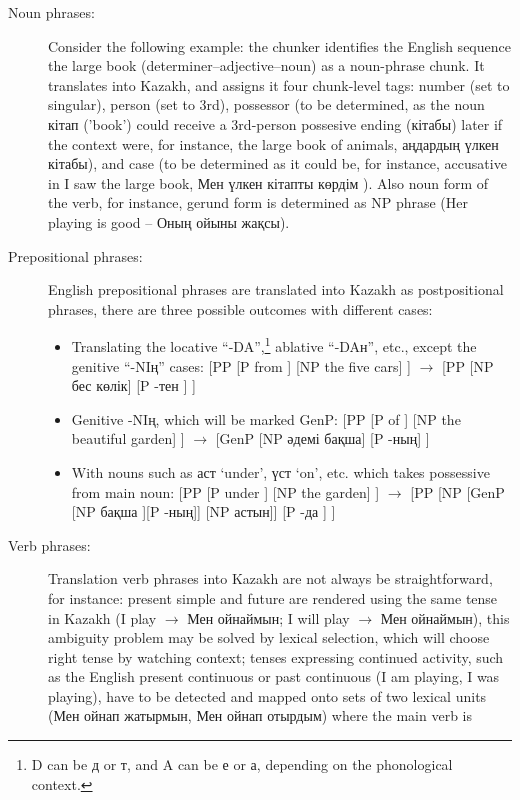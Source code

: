 \documentclass[11pt]{article}
\begin{document}
\begin{description}
\item[Noun phrases:] Consider the following example: the chunker identifies the English sequence 
  the large book  (determiner–adjective–noun) as a noun-phrase chunk. It translates into 
  Kazakh, and assigns it four chunk-level tags: number (set to singular), person (set to 3rd), 
  possessor (to be determined, as the noun кітап ('book') could receive a 3rd-person possesive 
  ending (кітабы) later if the context were, for instance, the large book of animals, аңдардың үлкен кітабы), 
  and case (to be determined as it could be, for instance, accusative in I saw the large book, Мен үлкен кітапты көрдім ). Also 
  noun form of the verb, for instance,  gerund form is determined as NP phrase (Her playing is good – Оның ойыны жақсы).
\item[Prepositional phrases:] English prepositional phrases are translated into Kazakh as postpositional phrases, 
  there are three possible outcomes with different cases:
   \begin{itemize}
    \item Translating the locative ``-{D}{A}'',\footnote{{D} can be д or т, and {A} can be е or а, depending on the 
        phonological context.} ablative ``-{D}{A}н'', etc., except the genitive ``-{N}{I}ң'' cases: 
        [PP [P from ] [NP the five cars] ] $\rightarrow$ [PP [NP бес көлік] [P -тен ] ]
    \item Genitive -{N}{I}ң, which will be marked GenP:  
        [PP [P of ] [NP the beautiful garden] ] $\rightarrow$ [GenP [NP әдемі бақша] [P -ның] ] 
    \item With nouns such as аст `under', үст `on', etc. which takes possessive from main noun:  
        [PP [P under ] [NP the garden] ] $\rightarrow$ [PP [NP [GenP [NP бақша ][P -ның]] [NP астын]] [P -да ] ]
    \end{itemize}
\item[Verb phrases:] Translation verb phrases into Kazakh  are not always be straightforward, for instance: 
  present simple and future are rendered using the same tense in Kazakh (I play $\rightarrow$ Мен ойнаймын;  I 
  will play $\rightarrow$ Мен ойнаймын), this ambiguity problem may be solved by lexical selection, 
  which will choose right tense by watching context; tenses expressing continued activity, such as the 
  English present continuous or past continuous (I am playing, I was playing), have to be detected and 
  mapped onto sets of two lexical units (Мен ойнап жатырмын, Мен ойнап отырдым) where the main verb is 

\end{description}
\end{document}
